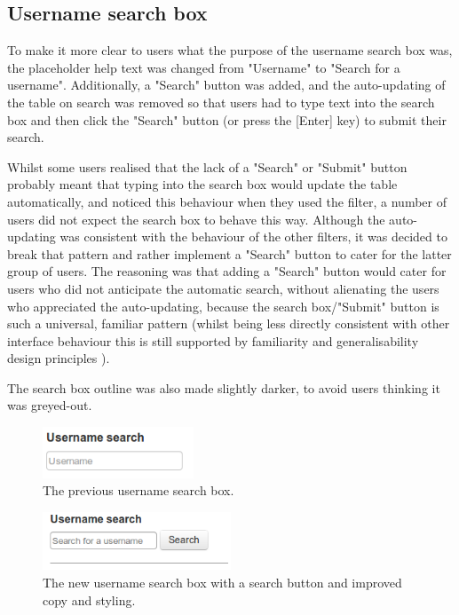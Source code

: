\subsection{Username search box}
\label{sec:searchbox}
To make it more clear to users what the purpose of the username search box was, the placeholder help text was changed from "Username" to "Search for a username". Additionally, a "Search" button was added, and the auto-updating of the table on search was removed so that users had to type text into the search box and then click the "Search" button (or press the [Enter] key) to submit their search. 

Whilst some users realised that the lack of a "Search" or "Submit" button probably meant that typing into the search box would update the table automatically, and noticed this behaviour when they used the filter, a number of users did not expect the search box to behave this way. Although the auto-updating was consistent with the behaviour of the other filters, it was decided to break that pattern and rather implement a "Search" button to cater for the latter group of users. The reasoning was that adding a "Search" button would cater for users who did not anticipate the automatic search, without alienating the users who appreciated the auto-updating, because the search box/"Submit" button is such a universal, familiar pattern (whilst being less directly consistent with other interface behaviour this is still supported by familiarity and generalisability design principles \citep[p. 264]{DixFinlay}). 

The search box outline was also made slightly darker, to avoid users thinking it was greyed-out.

\begin{figure}[h!]
    \centering
    \includegraphics[width=0.4\textwidth]{Figures/V2/usernameold.png}
 \caption{The previous username search box.}
\end{figure}

\begin{figure}[h!]
    \centering
    \includegraphics[width=0.5\textwidth]{Figures/V2/usernamenew.png}
 \caption{The new username search box with a search button and improved copy and styling.}
\end{figure}



